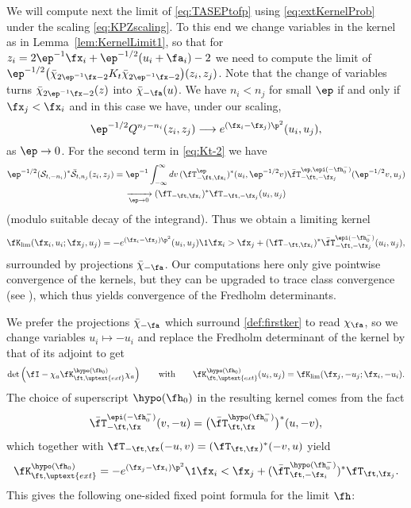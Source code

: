 \documentclass[]{pcmi}
\theoremstyle{plain}
\theoremstyle{definition}
\renewcommand{\SM}{\mathcal{S}}
\renewcommand{\SN}{\bar{\mathcal{S}}}
\begin{document}
We will compute next the limit of \eqref{eq:TASEPtofp} using \eqref{eq:extKernelProb} under the scaling \eqref{eq:KPZscaling}.
To this end we change variables in the kernel as in Lemma~\ref{lem:KernelLimit1}, so that for $z_i=2\ep^{-1}\fx_i+\ep^{-1/2}(u_i+\fa_i)-2$ we need to compute the limit of $\ep^{-1/2}\big(\bar\chi_{2\ep^{-1}\fx-2}K_t\bar\chi_{2\ep^{-1}\fx-2}\big)(z_i,z_j)$.
Note that the change of variables turns $\bar\chi_{2\ep^{-1}\fx-2}(z)$ into $\bar\chi_{-\fa}(u)$.
We have $n_i<n_j$ for small $\ep$ if and only if $\fx_j<\fx_i$ and in this case we have, under our scaling,
\[\ep^{-1/2}Q^{n_j-n_i}(z_i,z_j)\longrightarrow e^{(\fx_i-\fx_j)\p^2}(u_i,u_j),\]
as $\ep\to 0$. For the second term in \eqref{eq:Kt-2} we have
\begin{multline}
\ep^{-1/2}(\SM_{t,-{n}_i})^*\SN_{t,n_j}(z_i,z_j)=\ep^{-1}\int_{-\infty}^{\infty}dv\,(\fT_{-\ft,\fx_i}^\ep)^*(u_i,\ep^{-1/2}v)\bar\fT^{\ep,\epi(-\fh_0^-)}_{-\ft,-\fx_j}(\ep^{-1/2}v,u_j)\\
\xrightarrow[\ep\to0]{}(\fT_{-\ft,\fx_i})^*\fT_{-\ft,-\fx_j}(u_i,u_j)
\end{multline}
(modulo suitable decay of the integrand).
Thus we obtain a limiting kernel
\begin{equation}\label{def:firstker}
\fK_{\lim}(\fx_i,u_i;\fx_j,u_j)=-e^{(\fx_i-\fx_j)\p^2}(u_i,u_j)\1{\fx_i>\fx_j}+(\fT_{-\ft,\fx_i})^*\bar \fT^{\epi(-\fh_0^-)}_{-\ft,-\fx_j}(u_i,u_j),
\end{equation}
surrounded by projections $\bar\chi_{-\fa}$.
Our computations here only give pointwise convergence of the kernels, but they can be upgraded to trace class convergence (see \cite{KPZ}), which thus yields convergence of the Fredholm determinants.

We prefer the projections $\bar\chi_{-\fa}$ which surround \eqref{def:firstker} to read $\chi_{\fa}$, so we change variables $u_i\longmapsto-u_i$ and replace the Fredholm determinant of the kernel by that of its adjoint to get 
\[\det\left(\fI-\chi_{a}\fK^{\hypo(\fh_0)}_{\ft,\uptext{ext}}\chi_{a}\right)\qquad\text{with}\qquad
\fK^{\hypo(\fh_0)}_{\ft,\uptext{ext}}(u_i,u_j)=\fK_{\lim}(\fx_j,-u_j;\fx_i,-u_i).\]
The choice of superscript $\hypo(\fh_0)$ in the resulting kernel comes from the fact 
\[
\bar \fT^{\epi(-\fh_0^-)}_{-\ft,\fx}(v,-u)= \bigl(\bar\fT^{\hypo(\fh_0^-)}_{\ft,\fx}\bigr)^*(u,-v), 
\]
which together with $\fT_{-\ft,\fx}(-u,v)=(\fT_{\ft,\fx})^*(-v,u)$ yield 
\begin{equation}\label{eq:Kexthalf}
\fK^{\hypo(\fh_0)}_{\ft,\uptext{ext}}=-e^{(\fx_j-\fx_i)\p^2}\1{\fx_i<\fx_j}+(\bar \fT^{\hypo(\fh_0^-)}_{\ft,-\fx_i})^*\fT_{\ft,\fx_j}.
\end{equation}
This gives the following one-sided fixed point formula for the limit $\fh$:  
\end{document}
